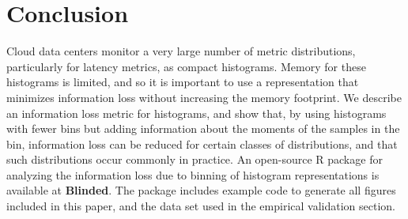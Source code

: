 \documentclass[preprint]{sig-alternate-per}
\begin{document}
\section{Conclusion}
\label{sec:Conclusions}

Cloud data centers monitor a very large number of metric distributions,
particularly for latency metrics, as compact histograms. Memory for
these histograms is limited, and so it is important to use a
representation that minimizes information loss without increasing the
memory footprint. We describe an information loss metric for
histograms, and show that, by using histograms with fewer bins but
adding information about the moments of the samples in the bin,
information loss can be reduced for certain classes of distributions,
and that such distributions occur commonly in practice.
An open-source R package for analyzing the information loss due to
binning of histogram representations is available at \textbf{Blinded}.
The package includes example code to
generate all figures included in this paper, and the data set
used in the empirical validation section.

%


{\footnotesize 
}

\end{document}
